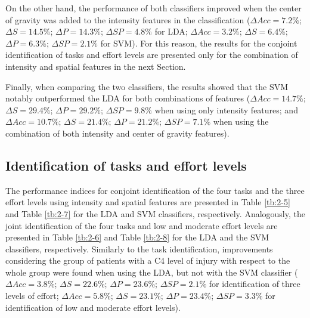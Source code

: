 On the other hand, the performance of both classifiers improved when the center of gravity was added to the intensity features in the classification ($\Delta Acc= 7.2\%$; $\Delta S= 14.5\%$; $\Delta P= 14.3\%$; $\Delta SP= 4.8\%$ for LDA; $\Delta Acc= 3.2\%$; $\Delta S= 6.4\%$; $\Delta P= 6.3\%$; $\Delta SP= 2.1\%$ for SVM). For this reason, the results for the conjoint identification of tasks and effort levels are presented only for the combination of intensity and spatial features in the next Section.

Finally, when comparing the two classifiers, the results showed that the SVM notably outperformed the LDA for both combinations of features ($\Delta Acc= 14.7\%$; $\Delta S= 29.4\%$; $\Delta P= 29.2\%$; $\Delta SP= 9.8\%$ when using only intensity features; and $\Delta Acc= 10.7\%$; $\Delta S= 21.4\%$; $\Delta P= 21.2\%$; $\Delta SP= 7.1\%$ when using the combination of both intensity and center of gravity features).


\subsection{Identification of tasks and effort levels}
The performance indices for conjoint identification of the four tasks and the three effort levels using intensity and spatial features are presented in Table \ref{tb:2-5} and Table \ref{tb:2-7} for the LDA and SVM classifiers, respectively. Analogously, the joint identification of the four tasks and low and moderate effort levels are presented in Table \ref{tb:2-6} and Table \ref{tb:2-8} for the LDA and the SVM classifiers, respectively.
Similarly to the task identification, improvements considering the group of patients with a C4 level of injury with respect to the whole group were found when using the LDA, but not with the SVM classifier ($\Delta Acc= 3.8\%$; $\Delta S= 22.6\%$; $\Delta P= 23.6\%$; $\Delta SP= 2.1\%$ for identification of three levels of effort; $\Delta Acc= 5.8\%$; $\Delta S= 23.1\%$; $\Delta P= 23.4\%$; $\Delta SP= 3.3\%$ for identification of low and moderate effort levels).

